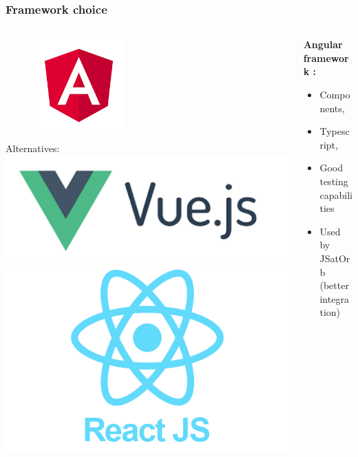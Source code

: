 \documentclass{beamer}
\begin{document}
\begin{frame}
\frametitle{Framework choice}
\begin{columns}[onlytextwidth]
	\begin{column}{0.6\textwidth}
		\begin{figure}
			\includegraphics[width=0.4\textwidth]{angular.png}
		\end{figure}
		\bigbreak
Alternatives:
\bigbreak
\centering
\includegraphics[height=.15\textheight]{vuejs.png}
\includegraphics[height=.15\textheight]{react.png}
	\end{column}
	\hfill
	\begin{column}{0.45\textwidth}
		\textbf{Angular framework :} 
		\begin{itemize}
			\item Components,
			\item Typescript,  
			\item Good testing capabilities
			
			\item Used by JSatOrb (better integration)
		\end{itemize}
		
	\end{column}
\end{columns}

\end{frame}
\end{document}
